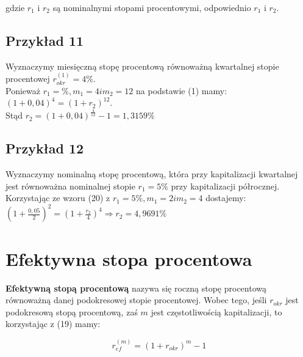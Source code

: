 \documentclass{article}
\begin{document}
gdzie $ r_1 $ i $ r_2 $ są nominalnymi stopami procentowymi, odpowiednio $ r_1 $ i $ r_2 $.\\

\subsection{Przykład 11}

Wyznaczymy miesięczną stopę procentową równoważną kwartalnej stopie procentowej $ r^{(1)}_{okr} = 4\% $.\\

Ponieważ $ r_1 = \%, m_1 = 4 i m_2 = 12 $ na podstawie (1) mamy:\\

$ (1 + 0,04)^4 = (1 + r_2)^{12} $.\\

Stąd $ r_2 = (1 + 0,04)^{\frac{4}{12}}-1 = 1,3159 \% $

\subsection{Przykład 12}

Wyznaczymy nominalną stopę procentową, która przy kapitalizacji kwartalnej jest równoważna nominalnej stopie $ r_1 = 5 \% $ przy kapitalizacji półrocznej.\\

Korzystając ze wzoru (20) z $ r_1 = 5 \%, m_1 = 2 i m_2 = 4 $ dostajemy:\\

$ (1 + \frac{0,05}{2})^2 = (1 + \frac{r_2}{4})^4 \Rightarrow r_2 =  4,9691 \% $

\newpage

%
%

\section{Efektywna stopa procentowa}

\textbf{Efektywną stopą procentową} nazywa się roczną stopę procentową równoważną danej podokresowej stopie procentowej. Wobec tego, jeśli $ r_{okr} $ jest podokresową stopą procentową, zaś $ m $ jest częstotliwością kapitalizacji, to korzystając z (19) mamy:

\begin{center}
	\begin{equation}
		r^{(m)}_{ef} = (1 + r_{okr})^m - 1
	\end{equation}
\end{center}\\
\end{document}
